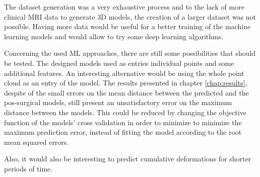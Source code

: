The dataset generation was a very exhaustive process and to the lack of more clinical MRI data to generate 3D models, the creation of a larger dataset was not possible. Having more data would be useful for a better training of the machine learning models and would allow to try some deep learning algorithms.

Concerning the used ML approaches, there are still some possibilities that should be tested. The designed models used as entries individual points and some additional features. An interesting alternative would be using the whole point cloud as an entry of the model. The results presented in chapter \ref{chap:results}, despite of the small errors on the mean distance between the predicted and the pos-surgical models, still present an unsatisfactory error on the maximum distance between the models. This could be reduced by changing the objective function of the models' cross validation in order to minimize to minimize the maximum prediction error, instead of fitting the model according to the root mean squared errors. 

Also, it would also be interesting to predict cumulative deformations for shorter periods of time.